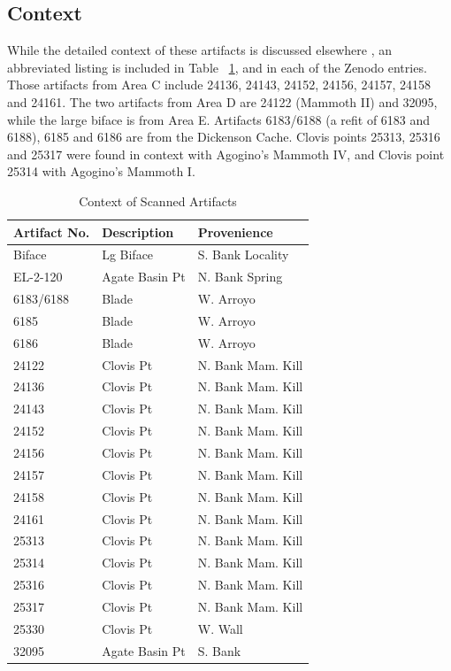 \documentclass[preprint,12pt]{elsarticle}
\begin{document}
\subsection{Context}

While the detailed context of these artifacts is discussed elsewhere \citep{RN4612, RN4604, RN4605, RN4606, RN4607, RN4609}, an abbreviated listing is included in Table ~\ref{tab:Tbl1}, and in each of the Zenodo entries. Those artifacts from Area C include 24136, 24143, 24152, 24156, 24157, 24158 and 24161. The two artifacts from Area D are 24122 (Mammoth II) and 32095, while the large biface is from Area E. Artifacts 6183/6188 (a refit of 6183 and 6188), 6185 and 6186 are from the Dickenson Cache. Clovis points 25313, 25316 and 25317 were found in context with Agogino's Mammoth IV, and Clovis point 25314 with Agogino's Mammoth I. 

\begin{table}[hbt]
\caption{Context of Scanned Artifacts}
\centering
\begin{tabular}{lll}
\hline
Artifact No. & Description & Provenience \\
\hline
Biface & Lg Biface & S. Bank Locality\\
EL-2-120 & Agate Basin Pt & N. Bank Spring\\
6183/6188 & Blade & W. Arroyo\\
6185 & Blade & W. Arroyo\\
6186 & Blade & W. Arroyo\\
24122 & Clovis Pt & N. Bank Mam. Kill\\
24136 & Clovis Pt & N. Bank Mam. Kill\\
24143 & Clovis Pt & N. Bank Mam. Kill\\
24152 & Clovis Pt & N. Bank Mam. Kill\\
24156 & Clovis Pt & N. Bank Mam. Kill\\
24157 & Clovis Pt & N. Bank Mam. Kill\\
24158 & Clovis Pt & N. Bank Mam. Kill\\
24161 & Clovis Pt & N. Bank Mam. Kill\\
25313 & Clovis Pt & N. Bank Mam. Kill\\
25314 & Clovis Pt & N. Bank Mam. Kill\\
25316 & Clovis Pt & N. Bank Mam. Kill\\
25317 & Clovis Pt & N. Bank Mam. Kill\\
25330 & Clovis Pt & W. Wall\\
32095 & Agate Basin Pt & S. Bank\\
\hline
\end{tabular}
\label{tab:Tbl1}
\end{table}
\end{document}
